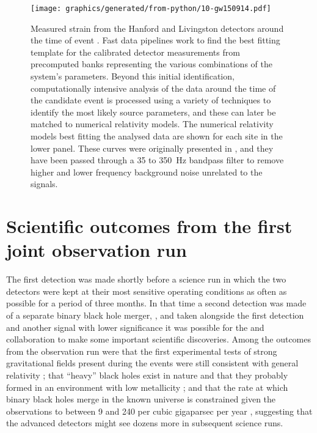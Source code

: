 \begin{figure}
  \centering
  \texttt{[image: graphics/generated/from-python/10-gw150914.pdf]}
  \caption[Measured strain from the LIGO Hanford and Livingston detectors around the time of event \GWFIRSTEVENT{}]{\label{fig:gw150914}Measured strain from the \LIGO{} Hanford and Livingston detectors around the time of event \GWFIRSTEVENT{}. Fast data pipelines work to find the best fitting template for the calibrated detector measurements from precomputed banks representing the various combinations of the system's parameters. Beyond this initial identification, computationally intensive analysis of the data around the time of the candidate event is processed using a variety of techniques to identify the most likely source parameters, and these can later be matched to numerical relativity models. The numerical relativity models best fitting the analysed data are shown for each site in the lower panel. These curves were originally presented in \cite{Abbott2016}, and they have been passed through a \num{35} to \SI{350}{\hertz} bandpass filter to remove higher and lower frequency background noise unrelated to the signals.}
\end{figure}

\section{Scientific outcomes from the first joint observation run}
The first detection was made shortly before a science run in which the two \LIGO{} detectors were kept at their most sensitive operating conditions as often as possible for a period of three months. In that time a second detection was made of a separate binary black hole merger, \GWSECONDEVENT{} \cite{Abbott2016b}, and taken alongside the first detection and another signal with lower significance it was possible for the \LSC{} and \VIRGO{} collaboration to make some important scientific discoveries. Among the outcomes from the observation run were that the first experimental tests of strong gravitational fields present during the events were still consistent with general relativity \cite{Abbott2016c}; that ``heavy'' black holes exist in nature and that they probably formed in an environment with low metallicity \cite{Abbott2016d}; and that the rate at which binary black holes merge in the known universe is constrained given the observations to between 9 and 240 per cubic gigaparsec per year \cite{lscvirgoo1}, suggesting that the advanced detectors might see dozens more in subsequent science runs.

